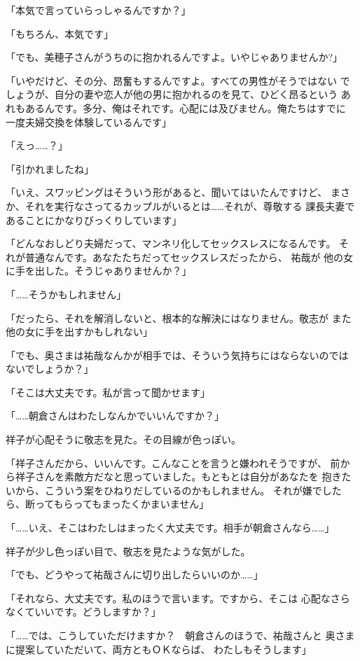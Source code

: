 ﻿\documentclass[
    book,tate,
    line_length=30zw,
    jafontsize=12pt,
    paper=b5j,
    landscape,
    ]{jlreq}
\begin{document}
「本気で言っていらっしゃるんですか？」

「もちろん、本気です」

「でも、美穂子さんがうちのに抱かれるんですよ。いやじゃありませんか?」

「いやだけど、その分、昂奮もするんですよ。すべての男性がそうではない
でしょうが、自分の妻や恋人が他の男に抱かれるのを見て、ひどく昂るという
あれもあるんです。多分、俺はそれです。心配には及びません。俺たちはすでに
一度夫婦交換を体験しているんです」

「えっ……？」

「引かれましたね」

「いえ、スワッピングはそういう形があると、聞いてはいたんですけど、
まさか、それを実行なさってるカップルがいるとは……それが、尊敬する
課長夫妻であることにかなりびっくりしています」

「どんなおしどり夫婦だって、マンネリ化してセックスレスになるんです。
それが普通なんです。あなたたちだってセックスレスだったから、 祐哉が
他の女に手を出した。そうじゃありませんか？」

「……そうかもしれません」

「だったら、それを解消しないと、根本的な解決にはなりません。敬志が
また他の女に手を出すかもしれない」

「でも、奥さまは祐哉なんかが相手では、そういう気持ちにはならないのでは
ないでしょうか？」

「そこは大丈夫です。私が言って聞かせます」

「……朝倉さんはわたしなんかでいいんですか？」

祥子が心配そうに敬志を見た。その目線が色っぽい。

「祥子さんだから、いいんです。こんなことを言うと嫌われそうですが、
前から祥子さんを素敵方だなと思っていました。もともとは自分があなたを
抱きたいから、こういう案をひねりだしているのかもしれません。
それが嫌でしたら、断ってもらってもまったくかまいません」

「……いえ、そこはわたしはまったく大丈夫です。相手が朝倉さんなら……」

祥子が少し色っぽい目で、敬志を見たような気がした。

「でも、どうやって祐哉さんに切り出したらいいのか……」

「それなら、大丈夫です。私のほうで言います。ですから、そこは
心配なさらなくていいです。どうしますか？」

「……では、こうしていただけますか？　朝倉さんのほうで、祐哉さんと
奥さまに提案していただいて、両方ともＯＫならば、 わたしもそうします」
\end{document}
